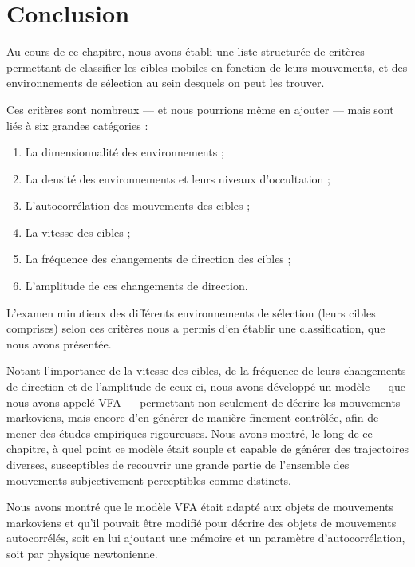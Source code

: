 \begin{landscape}
	\end{landscape}


\section{Conclusion}
	Au cours de ce chapitre, nous avons établi une liste structurée de critères permettant de classifier les cibles mobiles en fonction de leurs mouvements, et des environnements de sélection au sein desquels on peut les trouver.
	
	Ces critères sont nombreux --- et nous pourrions même en ajouter --- mais sont liés à six grandes catégories :
	
	\begin{enumerate}
		\item La dimensionnalité des environnements ;
		\item La densité des environnements et leurs niveaux d'occultation ;
		\item L'autocorrélation des mouvements des cibles ;
		\item La vitesse des cibles ;
		\item La fréquence des changements de direction des cibles ;
		\item L'amplitude de ces changements de direction.
	\end{enumerate}
	
	L'examen minutieux des différents environnements de sélection (leurs cibles comprises) selon ces critères nous a permis d'en établir une classification, que nous avons présentée.
	
	Notant l'importance de la vitesse des cibles, de la fréquence de leurs changements de direction et de l'amplitude de ceux-ci, nous avons développé un modèle --- que nous avons appelé VFA --- permettant non seulement de décrire les mouvements markoviens, mais encore d'en générer de manière finement contrôlée, afin de mener des études empiriques rigoureuses. Nous avons montré, le long de ce chapitre, à quel point ce modèle était souple et capable de générer des trajectoires diverses, susceptibles de recouvrir une grande partie de l'ensemble des mouvements subjectivement perceptibles comme distincts.
	
	Nous avons montré que le modèle VFA était adapté aux objets de mouvements markoviens et qu'il pouvait être modifié pour décrire des objets de mouvements autocorrélés, soit en lui ajoutant une mémoire et un paramètre d'autocorrélation, soit par physique newtonienne.
	
